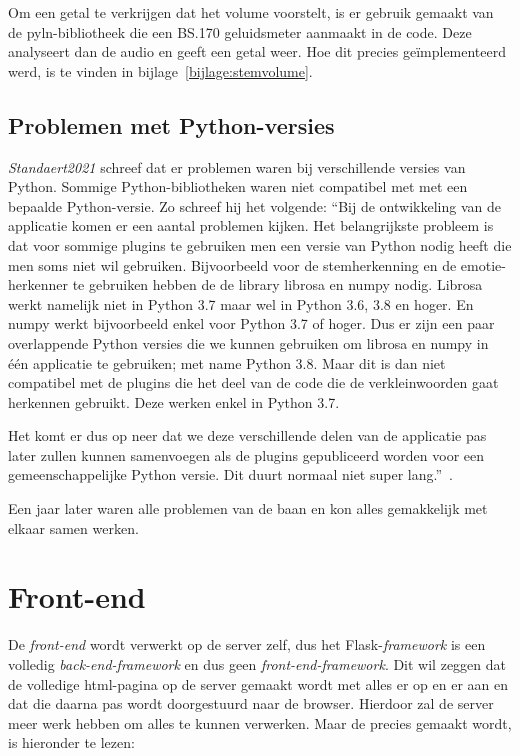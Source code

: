 Om een getal te verkrijgen dat het volume voorstelt, is er gebruik gemaakt van de pyln-bibliotheek die een BS.170 geluidsmeter aanmaakt in de code. Deze analyseert dan de audio en geeft een getal weer. Hoe dit precies geïmplementeerd werd, is te vinden in bijlage~\ref{bijlage:stemvolume}.

\subsection{Problemen met Python-versies}
\textit{Standaert2021} schreef dat er problemen waren bij verschillende versies van Python. Sommige Python-bibliotheken waren niet compatibel met met een bepaalde Python-versie. Zo schreef hij het volgende: 
``Bij de ontwikkeling van de applicatie komen er een aantal problemen kijken. Het belangrijkste
probleem is dat voor sommige plugins te gebruiken men een versie van Python
nodig heeft die men soms niet wil gebruiken. Bijvoorbeeld voor de stemherkenning en
de emotie-herkenner te gebruiken hebben de de library librosa en numpy nodig. Librosa
werkt namelijk niet in Python 3.7 maar wel in Python 3.6, 3.8 en hoger. En numpy werkt
bijvoorbeeld enkel voor Python 3.7 of hoger. Dus er zijn een paar overlappende Python
versies die we kunnen gebruiken om librosa en numpy in één applicatie te gebruiken; met
name Python 3.8. Maar dit is dan niet compatibel met de plugins die het deel van de code
die de verkleinwoorden gaat herkennen gebruikt. Deze werken enkel in Python 3.7.

Het komt er dus op neer dat we deze verschillende delen van de applicatie pas later zullen
kunnen samenvoegen als de plugins gepubliceerd worden voor een gemeenschappelijke
Python versie. Dit duurt normaal niet super lang.''~\autocite{Standaert2021}.

Een jaar later waren alle problemen van de baan en kon alles gemakkelijk met elkaar samen werken.

\section{Front-end}
De \textit{front-end} wordt verwerkt op de server zelf, dus het Flask-\textit{framework} is een volledig \textit{back-end-framework} en dus geen \textit{front-end-framework}. Dit wil zeggen dat de volledige html-pagina op de server gemaakt wordt met alles er op en er aan en dat die daarna pas wordt doorgestuurd naar de browser. Hierdoor zal de server meer werk hebben om alles te kunnen verwerken. Maar de  precies gemaakt wordt, is hieronder te lezen:

